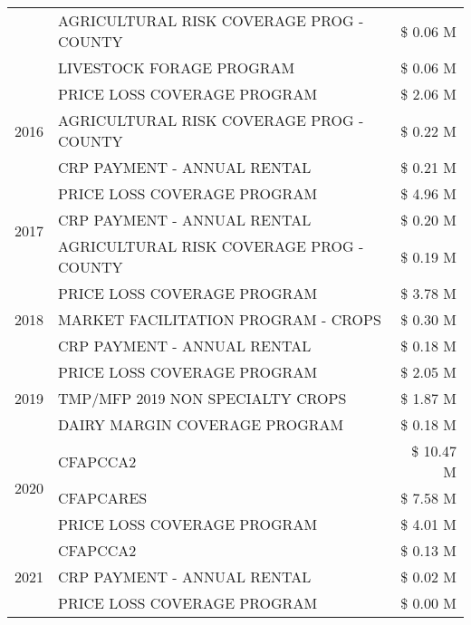 \begin{tabular}{llr}
 & AGRICULTURAL RISK COVERAGE PROG - COUNTY & \$ 0.06 M \\
 & LIVESTOCK FORAGE PROGRAM & \$ 0.06 M \\
\cline{1-3}
\multirow[t]{3}{*}{2016} & PRICE LOSS COVERAGE PROGRAM                   & \$ 2.06 M \\
 & AGRICULTURAL RISK COVERAGE PROG - COUNTY      & \$ 0.22 M \\
 & CRP PAYMENT - ANNUAL RENTAL                   & \$ 0.21 M \\
\cline{1-3}
\multirow[t]{3}{*}{2017} & PRICE LOSS COVERAGE PROGRAM & \$ 4.96 M \\
 & CRP PAYMENT - ANNUAL RENTAL & \$ 0.20 M \\
 & AGRICULTURAL RISK COVERAGE PROG - COUNTY & \$ 0.19 M \\
\cline{1-3}
\multirow[t]{3}{*}{2018} & PRICE LOSS COVERAGE PROGRAM & \$ 3.78 M \\
 & MARKET FACILITATION PROGRAM - CROPS & \$ 0.30 M \\
 & CRP PAYMENT - ANNUAL RENTAL & \$ 0.18 M \\
\cline{1-3}
\multirow[t]{3}{*}{2019} & PRICE LOSS COVERAGE PROGRAM & \$ 2.05 M \\
 & TMP/MFP 2019 NON SPECIALTY CROPS & \$ 1.87 M \\
 & DAIRY MARGIN COVERAGE PROGRAM & \$ 0.18 M \\
\cline{1-3}
\multirow[t]{3}{*}{2020} & CFAPCCA2 & \$ 10.47 M \\
 & CFAPCARES & \$ 7.58 M \\
 & PRICE LOSS COVERAGE PROGRAM & \$ 4.01 M \\
\cline{1-3}
\multirow[t]{3}{*}{2021} & CFAPCCA2 & \$ 0.13 M \\
 & CRP PAYMENT - ANNUAL RENTAL & \$ 0.02 M \\
 & PRICE LOSS COVERAGE PROGRAM & \$ 0.00 M \\
\cline{1-3}
\bottomrule
\end{tabular}
